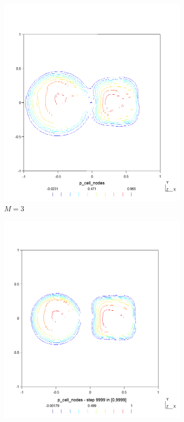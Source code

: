\begin{figure}[p!]
\begin{subfigure}{.5\textwidth}
        \includegraphics[width=\linewidth]{../figs/sols/kriv-sol-h3600o03}
        \caption{$M = 3$}
    \end{subfigure}
    \begin{subfigure}{.5\textwidth}
        \centering
        \includegraphics[width=\linewidth]{../figs/sols/kriv-sol-h6400o02}

\end{subfigure}
\end{figure}
